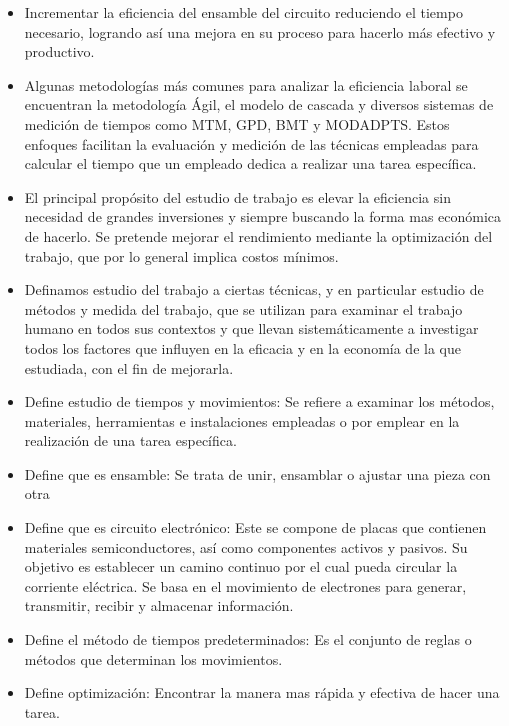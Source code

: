     
    \begin{itemize}
        \item Incrementar la eficiencia del ensamble del circuito reduciendo el tiempo necesario, logrando así una mejora en su proceso para hacerlo más efectivo y productivo.
        \item Algunas metodologías más comunes para analizar la eficiencia laboral se encuentran la metodología Ágil, el modelo de cascada y diversos sistemas de medición de tiempos como MTM, GPD, BMT y MODADPTS. Estos enfoques facilitan la evaluación y medición de las técnicas empleadas para calcular el tiempo que un empleado dedica a realizar una tarea específica.
        \item El principal propósito del estudio de trabajo es elevar la eficiencia sin necesidad de grandes inversiones y siempre buscando la forma mas económica de hacerlo. Se pretende mejorar el rendimiento mediante la optimización del trabajo, que por lo general implica costos mínimos.
        \item Definamos estudio del trabajo a ciertas técnicas, y en particular estudio de métodos y medida del trabajo, que se utilizan para examinar el trabajo humano en todos sus contextos y que llevan sistemáticamente a investigar todos los factores que influyen en la eficacia y en la economía de la que estudiada, con el fin de mejorarla. 
        \cite{neira2006tecnicas}
    
        \item Define estudio de tiempos y movimientos: Se refiere a examinar los métodos, materiales, herramientas e instalaciones empleadas o por emplear en la realización de una tarea específica.
        \item Define que es ensamble: Se trata de unir, ensamblar o ajustar una pieza con otra
        \item Define que es circuito electrónico: Este se compone de placas que contienen materiales semiconductores, así como componentes activos y pasivos. Su objetivo es establecer un camino continuo por el cual pueda circular la corriente eléctrica. Se basa en el movimiento de electrones para generar, transmitir, recibir y almacenar información.
        \item Define el método de tiempos predeterminados: Es el conjunto de reglas o métodos que determinan los movimientos. 
        \item Define optimización: Encontrar la manera mas rápida y efectiva de hacer una tarea. 
        
    \end{itemize}
